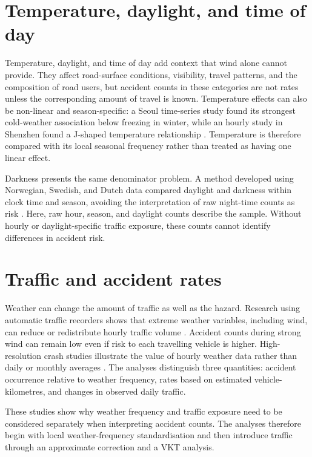 \section{Temperature, daylight, and time of day}

Temperature, daylight, and time of day add context that wind alone cannot
provide. They affect road-surface conditions, visibility, travel patterns, and
the composition of road users, but accident counts in these categories are not
rates unless the corresponding amount of travel is known. Temperature effects
can also be non-linear and season-specific: a Seoul time-series study found its
strongest cold-weather association below freezing in winter, while an hourly
study in Shenzhen found a J-shaped temperature relationship
\citep{lee2014,zhan2020}. Temperature is therefore compared with its local
seasonal frequency rather than treated as having one linear effect.

Darkness presents the same denominator problem. A method developed using
Norwegian, Swedish, and Dutch data compared daylight and darkness within clock
time and season, avoiding the interpretation of raw night-time counts as risk
\citep{johansson2009}. Here, raw hour, season, and daylight counts describe the
sample. Without hourly or daylight-specific traffic exposure, these counts cannot identify differences in accident risk.

\section{Traffic and accident rates}

Weather can change the amount of traffic as well as the hazard. Research using
automatic traffic recorders shows that extreme weather variables, including
wind, can reduce or redistribute hourly traffic volume
\citep{sathiaraj2018}. Accident counts during strong wind can remain low even if
risk to each travelling vehicle is higher. High-resolution crash studies
illustrate the value of hourly weather data rather than daily or monthly
averages \citep{xing2019}. The analyses distinguish
three quantities: accident occurrence relative to weather frequency,
rates based on estimated vehicle-kilometres, and changes in observed daily
traffic.

These studies show why weather frequency and traffic exposure need to be
considered separately when interpreting accident counts. The analyses therefore
begin with local weather-frequency standardisation and then introduce traffic
through an approximate correction and a VKT analysis.

